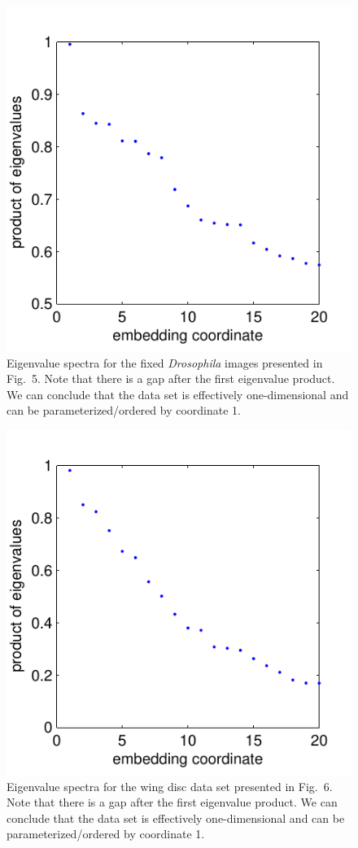 \documentclass[10pt,twocolumn]{article}
\newcommand{\fig}[0]{Fig.}
\begin{document}
\begin{figure}
\includegraphics{figS5}
\caption{Eigenvalue spectra for the fixed {\em Drosophila} images presented in \fig~5. Note that there is a gap after the first eigenvalue product. We can conclude that the data set is effectively one-dimensional and can be parameterized/ordered by coordinate 1.}
\end{figure}

\begin{figure}
\includegraphics{figS6}
\caption{Eigenvalue spectra for the wing disc data set presented in \fig~6. Note that there is a gap after the first eigenvalue product. We can conclude that the data set is effectively one-dimensional and can be parameterized/ordered by coordinate 1.}
\end{figure}
\end{document}
